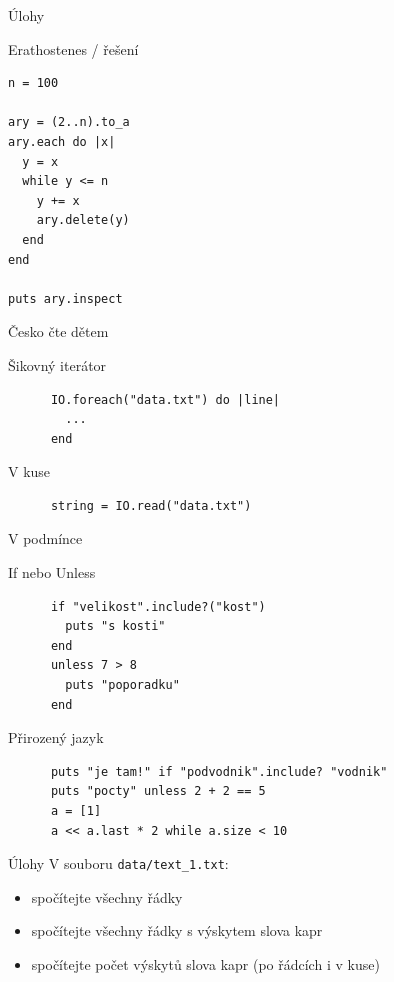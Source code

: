 \documentclass{beamer}
\begin{document}
\begin{frame}[fragile]{Úlohy}
  \begin{block}{Erathostenes / řešení}
\begin{verbatim}
n = 100

ary = (2..n).to_a
ary.each do |x|
  y = x
  while y <= n
    y += x
    ary.delete(y)
  end
end

puts ary.inspect
\end{verbatim}
  \end{block}
\end{frame}

\begin{frame}[fragile]{Česko čte dětem}
  \begin{block}{Šikovný iterátor}
    \begin{verbatim}
      IO.foreach("data.txt") do |line|
        ...
      end
    \end{verbatim}
  \end{block}
  \pause
  \begin{block}{V kuse}
    \begin{verbatim}
      string = IO.read("data.txt")
    \end{verbatim}
  \end{block}
\end{frame}

\begin{frame}[fragile]{V podmínce}
  \begin{block}{If nebo Unless}
    \scriptsize
    \begin{verbatim}
      if "velikost".include?("kost")
        puts "s kosti"
      end
      unless 7 > 8
        puts "poporadku"
      end
    \end{verbatim}
  \end{block}
  \pause
  \begin{block}{Přirozený jazyk}
    \scriptsize
    \begin{verbatim}
      puts "je tam!" if "podvodnik".include? "vodnik"
      puts "pocty" unless 2 + 2 == 5
      a = [1]
      a << a.last * 2 while a.size < 10
    \end{verbatim}
  \end{block}
\end{frame}

\begin{frame}{Úlohy}
  V souboru \texttt{data/text\_1.txt}:
  \begin{itemize}
    \item spočítejte všechny řádky
    \item spočítejte všechny řádky s výskytem slova kapr
    \item spočítejte počet výskytů slova kapr (po řádcích i v kuse)
  \end{itemize}
\end{frame}
\end{document}
